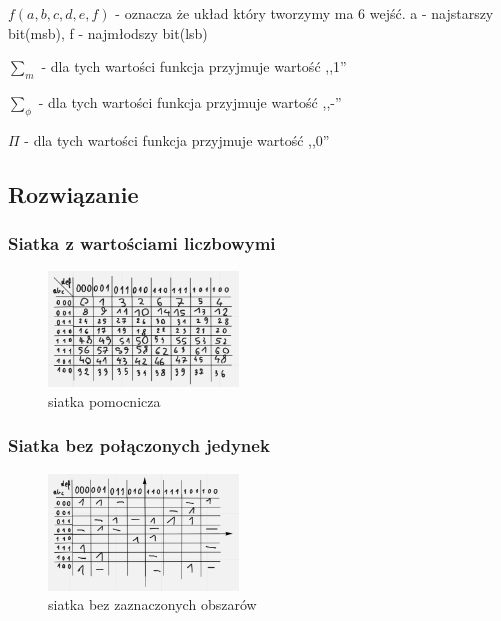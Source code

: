 $f(a,b,c,d,e,f)$ - oznacza że układ który tworzymy ma 6 wejść. a - najstarszy bit(msb), f - najmłodszy bit(lsb)

\vspace{1em}

$\sum_m$ - dla tych wartości funkcja przyjmuje wartość ,,1''

\vspace{1em}

$\sum_\phi$ - dla tych wartości funkcja przyjmuje wartość ,,-''

\vspace{1em}

$\Pi$ - dla tych wartości funkcja przyjmuje wartość ,,0''

\subsection{Rozwiązanie}

\subsubsection{Siatka z wartościami liczbowymi}

\begin{figure}[h!]
    \centering
    \includegraphics[width=0.45\textwidth]{images/karnaugh/k_t0.png}
    \caption{siatka pomocnicza}
    \label{fig:my_label}
\end{figure}

\subsubsection{Siatka bez połączonych jedynek}

\begin{figure}[h!]
    \centering
    \includegraphics[width=0.45\textwidth]{images/karnaugh/k_t1.png}
    \caption{siatka bez zaznaczonych obszarów}
    \label{fig:my_label}
\end{figure}

